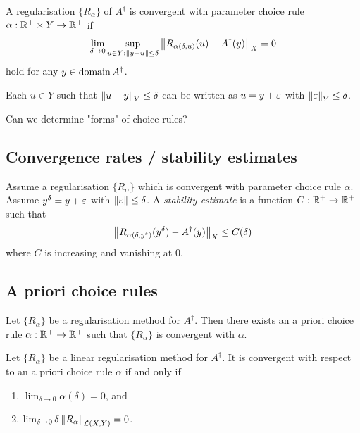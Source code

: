 \documentclass[12pt]{article}
\begin{document}
\begin{definition}
    A regularisation $\{R_\alpha\}$ of $A^\dagger $ is convergent with parameter choice rule $\alpha:\mathbb{R}^+\times Y\to \mathbb{R}^+$ if 
    \begin{equation*}
        \lim_{\delta\to 0} \sup_{u\in Y : \left\lVert y-u\right\rVert\leq \delta} \left\lVert R_{\alpha(\delta,u)}(u) - A^\dagger (y)\right\rVert_X=0
    \end{equation*} 
    hold for any $y\in \operatorname{domain} A^\dagger $.
\end{definition}
\begin{remark}
    Each $u\in Y$ such that $\left\lVert u-y\right\rVert_Y\leq \delta$ can be written as $u=y+\varepsilon$ with $\left\lVert\varepsilon\right\rVert_Y\leq \delta$.
\end{remark}

Can we determine "forms" of choice rules?

\subsection{Convergence rates / stability estimates}
\begin{definition}
    Assume a regularisation $\{R_\alpha\}$ which is convergent with parameter choice rule $\alpha$. Assume $y^\delta = y + \varepsilon$ with $\left\lVert\varepsilon\right\rVert\leq \delta$. A \textit{stability estimate} is a function $C:\mathbb{R}^+\to\mathbb{R}^+$ such that 
    \begin{equation*}
        \left\lVert R_{\alpha(\delta,y^\delta)}(y^\delta) - A^\dagger (y)\right\rVert_X \leq C(\delta)
    \end{equation*}
    where $C$ is increasing and vanishing at 0.
\end{definition}

\subsection{A priori choice rules}
\begin{theorem}
    Let $\{R_\alpha\}$ be a regularisation method for $A^\dagger $. Then there exists an a priori choice rule $\alpha:\mathbb{R}^+\to\mathbb{R}^+$ such that $\{R_\alpha\}$ is convergent with $\alpha$.
\end{theorem}

\begin{theorem}
    Let $\{R_\alpha\}$ be a linear regularisation method for $A^\dagger $. It is convergent with respect to an a priori choice rule $\alpha$ if and only if 
    \begin{enumerate}[label=(\alph*)]
        \item $\lim_{\delta\to 0} \alpha(\delta) = 0$, and 
        \item $\lim_{\delta\to 0} \delta\left\lVert R_\alpha\right\rVert_{\mathcal{L}(X,Y)} = 0$.
    \end{enumerate}
\end{theorem}
\end{document}
